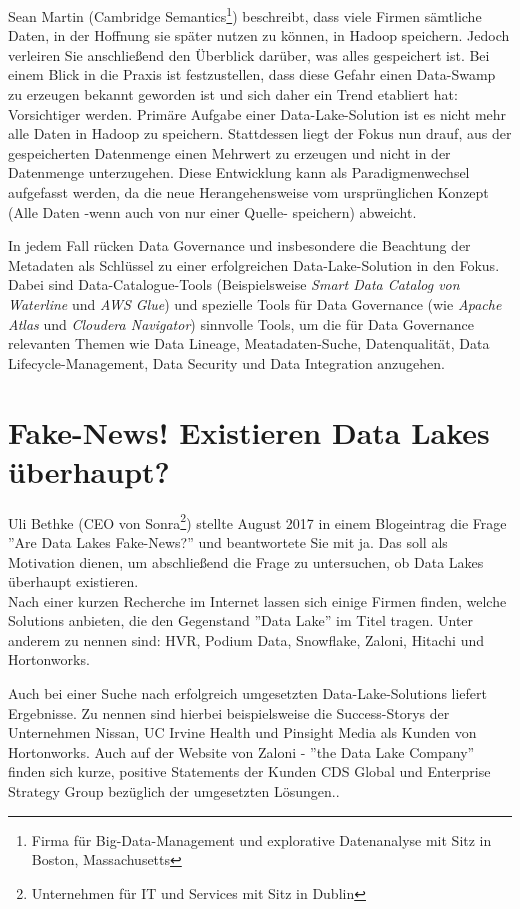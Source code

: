 \documentclass[twoside,twocolumn]{article}
\begin{document}
Sean Martin (Cambridge Semantics\footnote{Firma für Big-Data-Management und explorative Datenanalyse mit Sitz in Boston, Massachusetts}) beschreibt, dass viele Firmen sämtliche Daten, in der Hoffnung sie später nutzen zu können, in Hadoop speichern. Jedoch verleiren Sie anschließend den Überblick darüber, was alles gespeichert ist.
Bei einem Blick in die Praxis ist festzustellen, dass diese Gefahr einen Data-Swamp zu erzeugen bekannt geworden ist und sich daher ein Trend etabliert hat: Vorsichtiger werden. Primäre Aufgabe einer Data-Lake-Solution ist es nicht mehr alle Daten in Hadoop zu speichern. Stattdessen liegt der Fokus nun drauf, aus der gespeicherten Datenmenge einen Mehrwert zu erzeugen und nicht in der Datenmenge unterzugehen. \cite{src1} Diese Entwicklung kann als Paradigmenwechsel aufgefasst werden, da die neue Herangehensweise vom ursprünglichen Konzept (Alle Daten -wenn auch von nur einer Quelle- speichern) abweicht.

In jedem Fall rücken Data Governance und insbesondere die Beachtung der Metadaten als Schlüssel zu einer erfolgreichen Data-Lake-Solution in den Fokus. Dabei sind Data-Catalogue-Tools (Beispielsweise \textit{Smart Data Catalog von Waterline} und \textit{AWS Glue}) und spezielle Tools für Data Governance (wie \textit{Apache Atlas} und \textit{Cloudera Navigator}) sinnvolle Tools, um die für Data Governance relevanten Themen wie Data Lineage, Meatadaten-Suche, Datenqualität, Data Lifecycle-Management, Data Security und Data Integration anzugehen.\cite{src8}

\section{Fake-News! Existieren Data Lakes überhaupt?}
Uli Bethke (CEO von Sonra\footnote{Unternehmen für IT und Services mit Sitz in Dublin}) stellte August 2017 in einem Blogeintrag\cite{src4} die Frage ''Are Data Lakes Fake-News?'' und beantwortete Sie mit ja. Das soll als Motivation dienen, um abschließend die Frage zu untersuchen, ob Data Lakes überhaupt existieren.\\

Nach einer kurzen Recherche im Internet lassen sich einige Firmen finden, welche Solutions anbieten, die den Gegenstand ''Data Lake'' im Titel tragen. Unter anderem zu nennen sind: HVR, Podium Data, Snowflake, Zaloni\cite{c1}, Hitachi\cite{c2} und Hortonworks\cite{c3}.

Auch bei einer Suche nach erfolgreich umgesetzten Data-Lake-Solutions liefert Ergebnisse. 
Zu nennen sind hierbei beispielsweise die Success-Storys der Unternehmen Nissan\cite{s1}, UC Irvine Health\cite{s2} und Pinsight Media\cite{s3} als Kunden von Hortonworks. Auch auf der Website von Zaloni - ''the Data Lake Company'' finden sich kurze, positive Statements der Kunden CDS Global und Enterprise Strategy Group bezüglich der umgesetzten Lösungen.\cite{s4}.\\
\end{document}
